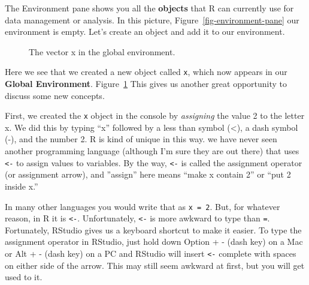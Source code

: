 \documentclass[
  letterpaper,
  DIV=11,
  numbers=noendperiod]{scrreprt}
\begin{document}
The Environment pane shows you all the \textbf{objects} that R can
currently use for data management or analysis. In this picture,
Figure~\ref{fig-environment-pane} our environment is empty. Let's create
an object and add it to our environment.

\begin{figure}


\caption{\label{fig-environment-pane2}The vector x in the global
environment.}

\end{figure}%

Here we see that we created a new object called \texttt{x}, which now
appears in our \textbf{Global Environment}.
Figure~\ref{fig-environment-pane2} This gives us another great
opportunity to discuss some new concepts.

First, we created the \texttt{x} object in the console by
\emph{assigning} the value 2 to the letter x. We did this by typing
``x'' followed by a less than symbol (\textless), a dash symbol (-), and
the number 2. R is kind of unique in this way. we have never seen
another programming language (although I'm sure they are out there) that
uses \texttt{\textless{}-} to assign values to variables. By the way,
\texttt{\textless{}-} is called the assignment operator (or assignment
arrow), and ''assign'' here means ``make x contain 2'' or ``put 2 inside
x.''

In many other languages you would write that as \texttt{x\ =\ 2}. But,
for whatever reason, in R it is \texttt{\textless{}-}. Unfortunately,
\texttt{\textless{}-} is more awkward to type than \texttt{=}.
Fortunately, RStudio gives us a keyboard shortcut to make it easier. To
type the assignment operator in RStudio, just hold down Option + - (dash
key) on a Mac or Alt + - (dash key) on a PC and RStudio will insert
\texttt{\textless{}-} complete with spaces on either side of the arrow.
This may still seem awkward at first, but you will get used to it.
\end{document}
